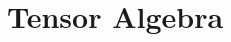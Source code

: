 \section{Tensor Algebra}




\begin{comment}
====================================================================================================
-A tensor can be seen as a function that takes a number of vectors and covectors  as inputs and 
 produces a scalar as output. This mapping is linear in all its inputs, i.e. it is a multilinear
 map.
-It can also be seen as a multidimensional array, or rather, a geometric of physical quantity that
 can be represented by such an array, once a basis has been chosen. The tensor itself is invariant
 ...or is this the right word? i think tensors can be covariant, contravariant or a mix of both. 
 Truly invariant are the scalars that result when fully evaluating a tensor. Regardless of the 
 chosen coordinate system, they will always have the same numerical value
-When seen as a multidimensional array, it must obey certain transformation rules, when the basis
 is changed.
-how can we interpret a matrix vector-product in this context? maybe as partial evaluation? 
 multiplying a matrix from the left by a vector gives another vector. this is a tensor that 
 requires another covector as input to produce a scalar
-what about inverse tensors and tensor division? i think, with repect to the tensor product, this
 would not make much sense. only when a tensor indeed resulted from tensor-multiplying two lower
 rank tensors, we may be able to calculate one of the factors, given the other factor and the 
 product
-Examples for tensor quantities are: scalars, vectors, linear maps, quadratic forms(?)

Let's try to express the some known products in terms of tensors and index notation:

scalar product: c = a^i b_i = b_i a^i  (product of vector a and covector b)
matrix-vector product: c_i = a^k_i b_k  (verify)
matrix-matrix product: ...
vector-matrix product:  ...
outer product of vectors: c_{ij} = a_i b_j  ...this is actually the tensor product

Kronecker product of two matrices: c_{ij kl} = a_{ij} b_{kl}
...but wait - no - this is a rank 4 tensor - the kronecker product is again a matrix - it has the
same elements but arranged ad 2D array rather than 4D

Questions:
-What about the various exterior products that can be computed from 1-vectors, 2-vectors, 
 1-covectors, 2-covectors, etc? How can they be expressed in index notation?
-What about the geometric products of various quantities in geometric algebra?


\end{comment}